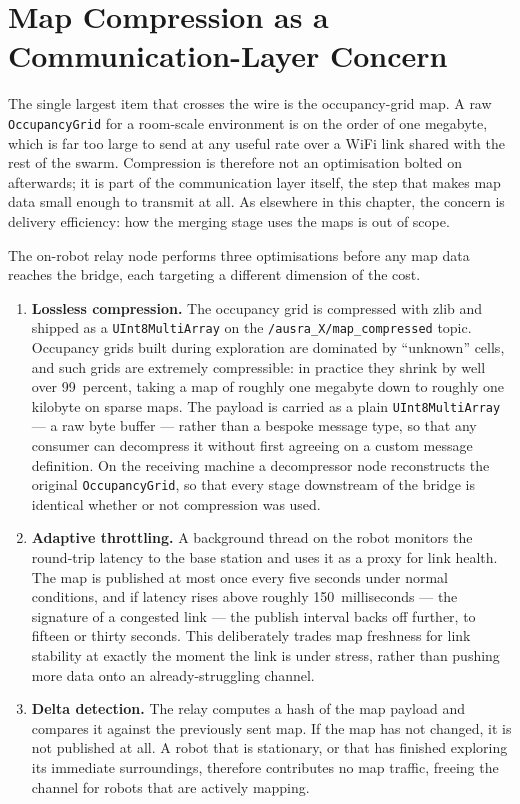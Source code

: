 \section{Map Compression as a Communication-Layer Concern}
\label{sec:compression}

The single largest item that crosses the wire is the occupancy-grid map. A raw \texttt{OccupancyGrid} for a room-scale environment is on the order of one megabyte, which is far too large to send at any useful rate over a WiFi link shared with the rest of the swarm. Compression is therefore not an optimisation bolted on afterwards; it is part of the communication layer itself, the step that makes map data small enough to transmit at all. As elsewhere in this chapter, the concern is delivery efficiency: how the merging stage uses the maps is out of scope.

The on-robot relay node performs three optimisations before any map data reaches the bridge, each targeting a different dimension of the cost.

\begin{enumerate}
    \item \textbf{Lossless compression.} The occupancy grid is compressed with zlib and shipped as a \texttt{UInt8MultiArray} on the \texttt{/ausra\_X/map\_compressed} topic. Occupancy grids built during exploration are dominated by ``unknown'' cells, and such grids are extremely compressible: in practice they shrink by well over 99~percent, taking a map of roughly one megabyte down to roughly one kilobyte on sparse maps. The payload is carried as a plain \texttt{UInt8MultiArray} --- a raw byte buffer --- rather than a bespoke message type, so that any consumer can decompress it without first agreeing on a custom message definition. On the receiving machine a decompressor node reconstructs the original \texttt{OccupancyGrid}, so that every stage downstream of the bridge is identical whether or not compression was used.
    \item \textbf{Adaptive throttling.} A background thread on the robot monitors the round-trip latency to the base station and uses it as a proxy for link health. The map is published at most once every five seconds under normal conditions, and if latency rises above roughly 150~milliseconds --- the signature of a congested link --- the publish interval backs off further, to fifteen or thirty seconds. This deliberately trades map freshness for link stability at exactly the moment the link is under stress, rather than pushing more data onto an already-struggling channel.
    \item \textbf{Delta detection.} The relay computes a hash of the map payload and compares it against the previously sent map. If the map has not changed, it is not published at all. A robot that is stationary, or that has finished exploring its immediate surroundings, therefore contributes no map traffic, freeing the channel for robots that are actively mapping.
\end{enumerate}


